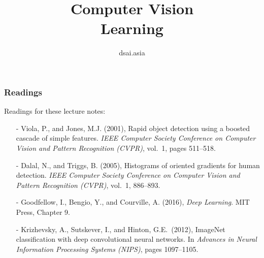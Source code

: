 \documentclass[aspectratio=169]{beamer}
\title[Computer Vision]{Computer Vision\\Learning}
\author{dsai.asia}
\institute[]{Asia Data Science and Artificial Intelligence Master's Program}
\date{}
\begin{document}


\frame{\titlepage}

%

\begin{frame}
\frametitle{Readings}

Readings for these lecture notes:
\begin{itemize}
\item[-] Viola, P., and Jones, M.J. (2001), Rapid object detection
  using a boosted cascade of simple features. \textit{IEEE Computer
    Society Conference on Computer Vision and Pattern Recognition
    (CVPR)}, vol.\ 1, pages 511--518.
\item[-] Dalal, N., and Triggs, B. (2005), Histograms of oriented
  gradients for human detection.  \textit{IEEE Computer Society
    Conference on Computer Vision and Pattern Recognition (CVPR)},
  vol.\ 1, 886--893.
\item[-] Goodfellow, I., Bengio, Y., and Courville, A. (2016),
  \textit{Deep Learning}. MIT Press, Chapter 9.
\item[-] Krizhevsky, A., Sutskever, I., and Hinton, G.E.\ (2012),
  ImageNet classification with deep convolutional neural networks. In
  \textit{Advances in Neural Information Processing Systems (NIPS)},
  pages 1097--1105.
\end{itemize}

\end{frame}
\end{document}
